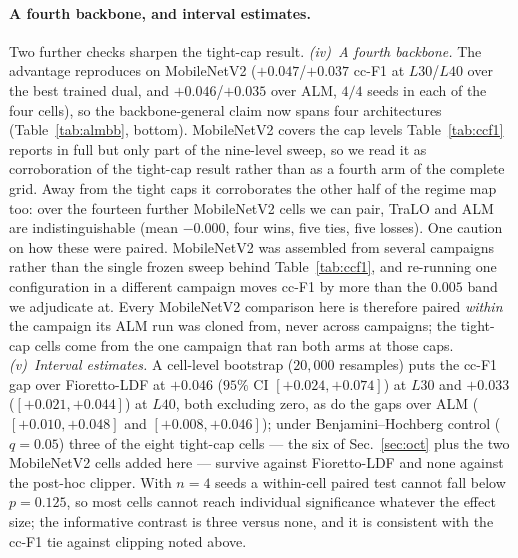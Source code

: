 \documentclass[10pt]{article}
\begin{document}
{\paragraph{A fourth backbone, and interval estimates.}
Two further checks sharpen the tight-cap result. \emph{(iv)~A fourth
backbone.} The advantage reproduces on MobileNetV2 ($+0.047$/$+0.037$ cc-F1 at
$L30$/$L40$ over the best trained dual, and $+0.046$/$+0.035$ over ALM, $4/4$
seeds in each of the four cells), so the backbone-general claim now spans four
architectures (Table~\ref{tab:almbb}, bottom). MobileNetV2 covers the cap levels
Table~\ref{tab:ccf1} reports in full but only part of the nine-level sweep, so we
read it as corroboration of the tight-cap result rather than as a fourth arm of
the complete grid. Away from the tight caps it corroborates the other half of the
regime map too: over the fourteen further MobileNetV2 cells we can pair, TraLO
and ALM are indistinguishable (mean $-0.000$, four wins, five ties, five losses).
One caution on how these were paired. MobileNetV2 was assembled from several
campaigns rather than the single frozen sweep behind
Table~\ref{tab:ccf1}, and re-running one configuration in a different campaign
moves cc-F1 by more than the $0.005$ band we adjudicate at. Every MobileNetV2
comparison here is therefore paired \emph{within} the campaign its ALM run was
cloned from, never across campaigns; the tight-cap cells come from the one
campaign that ran both arms at those caps. \emph{(v)~Interval estimates.} A
cell-level bootstrap ($20{,}000$ resamples) puts the cc-F1 gap over Fioretto-LDF at
$+0.046$ ($95\%$ CI $[{+}0.024,{+}0.074]$) at $L30$ and $+0.033$
($[{+}0.021,{+}0.044]$) at $L40$, both excluding zero, as do the gaps over ALM
($[{+}0.010,{+}0.048]$ and $[{+}0.008,{+}0.046]$); under Benjamini--Hochberg control
($q{=}0.05$) three of the eight tight-cap cells --- the six of Sec.~\ref{sec:oct} plus the
two MobileNetV2 cells added here --- survive against Fioretto-LDF and none
against the post-hoc clipper. With $n{=}4$ seeds a within-cell paired test cannot fall
below $p{=}0.125$, so most cells cannot reach individual significance whatever the effect
size; the informative contrast is three versus none, and it is consistent with the cc-F1
tie against clipping noted above.}
\end{document}
